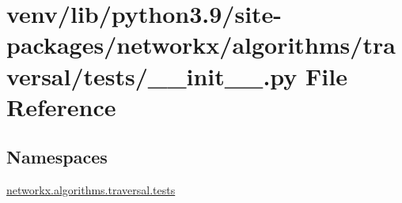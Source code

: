 \hypertarget{venv_2lib_2python3_89_2site-packages_2networkx_2algorithms_2traversal_2tests_2____init_____8py}{}\section{venv/lib/python3.9/site-\/packages/networkx/algorithms/traversal/tests/\+\_\+\+\_\+init\+\_\+\+\_\+.py File Reference}
\label{venv_2lib_2python3_89_2site-packages_2networkx_2algorithms_2traversal_2tests_2____init_____8py}
\subsection*{Namespaces}
\begin{DoxyCompactItemize}
\item 
 \hyperlink{namespacenetworkx_1_1algorithms_1_1traversal_1_1tests}{networkx.\+algorithms.\+traversal.\+tests}
\end{DoxyCompactItemize}
